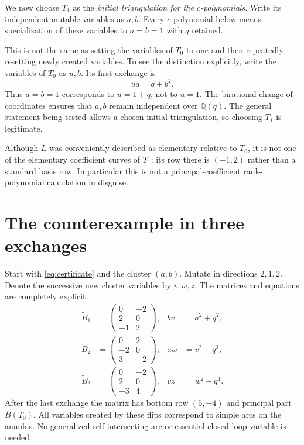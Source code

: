 \documentclass[11pt,letterpaper]{article}
\numberwithin{equation}{section}
\theoremstyle{definition}
\newcommand{\Q}{\mathbb Q}
\newcommand{\Btilde}{\widetilde B}
\begin{document}
We now choose $T_1$ as the \emph{initial triangulation for the $c$-polynomials}.
Write its independent mutable variables as $a,b$. Every $c$-polynomial below
means specialization of these variables to $a=b=1$ with $q$ retained.

This is not the same as setting the variables of $T_0$ to one and then
repeatedly resetting newly created variables. To see the distinction
explicitly, write the variables of $T_0$ as $u,b$. Its first exchange is
\[
 ua=q+b^2.
\]
Thus $a=b=1$ corresponds to $u=1+q$, not to $u=1$. The birational change of
coordinates ensures that $a,b$ remain independent over $\Q(q)$. The general
statement being tested allows a chosen initial triangulation, so choosing
$T_1$ is legitimate.

Although $L$ was conveniently described as elementary relative to $T_0$, it
is not one of the elementary coefficient curves of $T_1$: its row there is
$(-1,2)$ rather than a standard basis row. In particular this is not a
principal-coefficient rank-polynomial calculation in disguise.

\section{The counterexample in three exchanges}\label{sec:small}

Start with \eqref{eq:certificate} and the cluster $(a,b)$. Mutate in directions
$2,1,2$. Denote the successive new cluster variables by $v,w,z$. The matrices
and equations are completely explicit:
\begin{align}
 \Btilde_1&=\begin{pmatrix}0&-2\\2&0\\-1&2\end{pmatrix},
 & bv&=a^2+q^2,\label{eq:firstexchange}\\
 \Btilde_2&=\begin{pmatrix}0&2\\-2&0\\3&-2\end{pmatrix},
 & aw&=v^2+q^3,\label{eq:secondexchange}\\
 \Btilde_3&=\begin{pmatrix}0&-2\\2&0\\-3&4\end{pmatrix},
 & vz&=w^2+q^4.\label{eq:thirdexchange}
\end{align}
After the last exchange the matrix has bottom row $(5,-4)$ and principal
part $B(T_0)$. All variables created by these flips correspond to simple arcs
on the annulus. No generalized self-intersecting arc or essential closed-loop
variable is needed.
\end{document}
